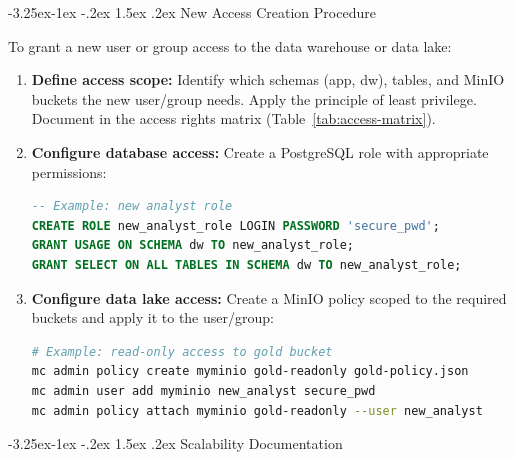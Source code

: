 \documentclass[a4paper,11pt,oneside,openany]{report}
\makeatletter
\renewcommand\subsection{\@startsection{subsection}{2}{\z@}%
  {-3.25ex\@plus -1ex \@minus -.2ex}%
  {1.5ex \@plus .2ex}%
  {\normalfont\large\bfseries\color{ntdarkgreen}}}
\makeatother
\begin{document}
\subsection{New Access Creation Procedure}

To grant a new user or group access to the data warehouse or data lake:

\begin{enumerate}[nosep]
  \item \textbf{Define access scope:} Identify which schemas (app, dw),
        tables, and MinIO buckets the new user/group needs. Apply the
        principle of least privilege. Document in the access rights matrix
        (Table~\ref{tab:access-matrix}).
  \item \textbf{Configure database access:} Create a PostgreSQL role with
        appropriate permissions:
        \begin{lstlisting}[language=SQL, numbers=none, frame=none, xleftmargin=0em, framexleftmargin=0em]
-- Example: new analyst role
CREATE ROLE new_analyst_role LOGIN PASSWORD 'secure_pwd';
GRANT USAGE ON SCHEMA dw TO new_analyst_role;
GRANT SELECT ON ALL TABLES IN SCHEMA dw TO new_analyst_role;
        \end{lstlisting}
  \item \textbf{Configure data lake access:} Create a MinIO policy scoped
        to the required buckets and apply it to the user/group:
        \begin{lstlisting}[language=bash, numbers=none, frame=none, xleftmargin=0em, framexleftmargin=0em]
# Example: read-only access to gold bucket
mc admin policy create myminio gold-readonly gold-policy.json
mc admin user add myminio new_analyst secure_pwd
mc admin policy attach myminio gold-readonly --user new_analyst
        \end{lstlisting}
\end{enumerate}

\subsection{Scalability Documentation}
\end{document}
